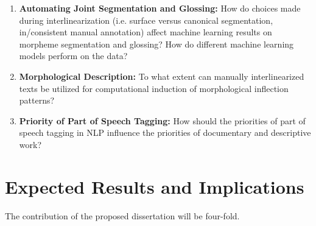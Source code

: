 \begin{enumerate}
\item{} \textbf{Automating Joint Segmentation and Glossing:} How do choices made during interlinearization (i.e. surface versus canonical segmentation, in/consistent manual annotation) affect machine learning results on morpheme segmentation and glossing? How do different machine learning models perform on the data?


\item{} \textbf{Morphological Description:} To what extent can manually interlinearized texts be utilized for computational induction of morphological inflection patterns?

\item \textbf{Priority of Part of Speech Tagging:} How should the priorities of part of speech tagging in NLP influence the priorities of documentary and descriptive work?

\end{enumerate}

\section{Expected Results and Implications}

The contribution of the proposed dissertation will be four-fold. 

